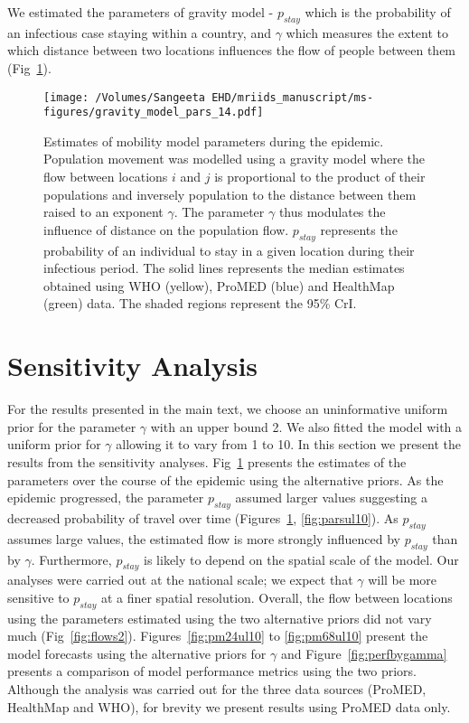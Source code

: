 \documentclass[9pt,twoside,lineno]{pnas-new}
\begin{document}
We estimated the parameters of gravity model  -
$p_{stay}$ which is the probability of an infectious case staying
within a country, and $\gamma$ which measures the extent to which
distance between two locations influences the flow of people between
them (Fig~\ref{fig:parsul2}).


\begin{figure}
  \texttt{[image: /Volumes/Sangeeta EHD/mriids\_manuscript/ms-figures/gravity\_model\_pars\_14.pdf]}
  \caption{Estimates of mobility model
    parameters during the epidemic. Population movement was modelled using a
    gravity model where the flow between locations \(i\) and \(j\) is
    proportional to the product of their populations and inversely
    population to the distance between them raised to an exponent
    \(\gamma\). The parameter \(\gamma\) thus modulates the influence of
    distance on the population flow. \(p_{stay}\) represents the probability
    of an individual to stay in a given location during their infectious
    period. The solid lines represents the median estimates obtained using
    WHO (yellow), ProMED (blue) and HealthMap (green) data. The shaded
    regions represent the 95\% CrI.}
  \label{fig:parsul2}
\end{figure}\FloatBarrier


\section{Sensitivity Analysis}\label{sec:sensitivity-analysis}

For the results presented in the main text, we choose an uninformative
uniform prior for the parameter \(\gamma\) with an upper bound 2. We
also fitted the model with a uniform prior for \(\gamma\) allowing it to
vary from 1 to 10. In this section we present the results from the
sensitivity analyses. Fig~\ref{fig:parsul2} presents the
estimates of the parameters over the course of the epidemic using the
alternative priors. As the epidemic progressed, 
the parameter $p_{stay}$ assumed larger values suggesting a decreased
probability of travel over time (Figures~\ref{fig:parsul2},
\ref{fig:parsul10}). As $p_{stay}$ assumes large values,
the estimated flow is more strongly influenced by $p_{stay}$ than by
$\gamma$. Furthermore, $p_{stay}$ is likely to depend on the spatial
scale of the model. Our analyses were carried out at the
national scale; we expect that $\gamma$ will be more sensitive to
$p_{stay}$ at a finer spatial resolution. Overall, the  flow
between locations using the parameters estimated using the two
alternative priors did not vary much
(Fig~\ref{fig:flows2}). Figures~\ref{fig:pm24ul10} to \ref{fig:pm68ul10}
present the model forecasts using the alternative priors for $\gamma$
and Figure~\ref{fig:perfbygamma} presents a comparison of model
performance metrics using the two priors.
Although the analysis was carried out for the
three data sources (ProMED, HealthMap and WHO), for brevity we present
results using ProMED data only.
\end{document}
